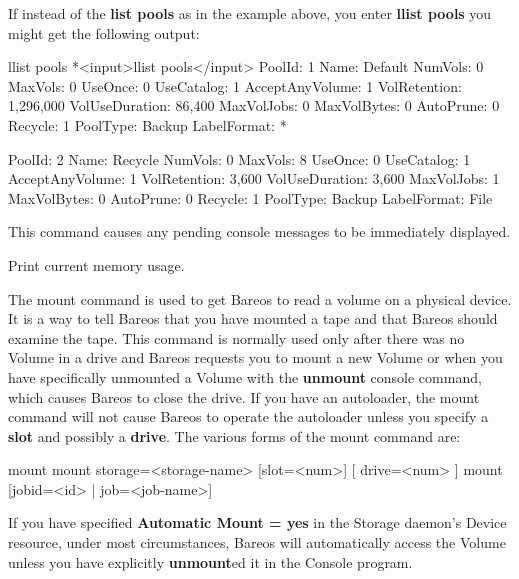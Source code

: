 \begin{description}
   If instead of the {\bf list pools} as in the example above, you enter
   {\bf llist pools} you might get the following output:

\begin{bconsole}{llist pools}
*<input>llist pools</input>
          PoolId: 1
            Name: Default
         NumVols: 0
         MaxVols: 0
         UseOnce: 0
      UseCatalog: 1
 AcceptAnyVolume: 1
    VolRetention: 1,296,000
  VolUseDuration: 86,400
      MaxVolJobs: 0
     MaxVolBytes: 0
       AutoPrune: 0
         Recycle: 1
        PoolType: Backup
     LabelFormat: *

          PoolId: 2
            Name: Recycle
         NumVols: 0
         MaxVols: 8
         UseOnce: 0
      UseCatalog: 1
 AcceptAnyVolume: 1
    VolRetention: 3,600
  VolUseDuration: 3,600
      MaxVolJobs: 1
     MaxVolBytes: 0
       AutoPrune: 0
         Recycle: 1
        PoolType: Backup
     LabelFormat: File
\end{bconsole}

\item [messages]
   This command causes any pending  console messages to be immediately displayed.

\item [memory]
   Print current memory usage.


\item [mount]
   The mount command is used to get Bareos to read a volume on a physical
   device.  It is a way to tell Bareos that you have mounted a tape and
   that Bareos should examine the tape.  This command is normally
   used only after there was no Volume in a drive and Bareos requests you to mount a new
   Volume or when you have specifically unmounted a Volume with the {\bf
   unmount} console command, which causes Bareos to close the drive.  If
   you have an autoloader, the mount command will not cause Bareos to
   operate the autoloader unless you specify a {\bf slot} and possibly a
   {\bf drive}. The various forms of the mount command are:

\begin{bconsole}{mount}
mount  storage=<storage-name> [slot=<num>] [
       drive=<num> ]
mount [jobid=<id> | job=<job-name>]
\end{bconsole}

   If you have specified {\bf Automatic  Mount = yes} in the Storage daemon's
   Device resource,  under most circumstances, Bareos will automatically access
   the Volume unless you have explicitly {\bf unmount}ed it in  the Console
   program.


\end{description}
